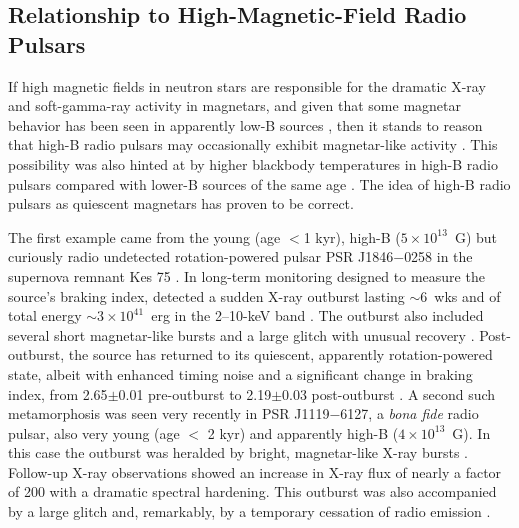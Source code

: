 \subsection{Relationship to High-Magnetic-Field Radio Pulsars}
\label{sec:highB}

If high magnetic fields in neutron stars are responsible for the dramatic X-ray and soft-gamma-ray activity in magnetars, and given
that some magnetar behavior has been seen in apparently low-B sources \citep[such as SGR 0418+5729;][]{ret+10}, then it stands
to reason that high-B radio pulsars may occasionally exhibit magnetar-like activity \citep{km05,nk11}.  
This possibility was also hinted at by higher blackbody temperatures in high-B radio pulsars compared
with lower-B sources of the same age \citep[e.g.][]{zkm+11,ozv+13}.
The idea of high-B radio pulsars as quiescent magnetars has proven
to be correct.

The first example came from the 
young (age $<$1 kyr), high-B ($5 \times 10^{13}$~G) but curiously
radio undetected \citep{aklm08} rotation-powered pulsar 
PSR J1846$-$0258 in the supernova remnant Kes 75 \citep{gvbt00}.   In long-term monitoring designed to 
measure the source's braking index, \citet{ggg+08} detected a sudden X-ray outburst lasting 
$\sim$6~wks and
of total energy $\sim 3 \times 10^{41}$~erg in the 2--10-keV band \citep[see also][]{ks08b}.  The outburst also included
several short magnetar-like bursts and a large glitch with unusual recovery \citep{kh09,lkg10}.
Post-outburst, the source has returned to its quiescent, apparently rotation-powered
state, albeit with enhanced timing noise and a significant change in braking index, from 
2.65$\pm$0.01 pre-outburst to 2.19$\pm$0.03 post-outburst \citep{lnk+11,akb+15}.  
A second such metamorphosis was seen very recently in PSR J1119$-$6127, a {\it bona fide} radio pulsar, also
very young (age $<$ 2 kyr) and apparently high-B ($4 \times 10^{13}$~G).  In this case the outburst was
heralded by bright, magnetar-like X-ray bursts \citep{ykr16,klm+16,glk+16}.  Follow-up X-ray observations \citep{akts16}
showed an increase in X-ray flux of nearly a factor of 200 with a dramatic spectral hardening.
This outburst was also accompanied
by a large glitch \citep{akts16} and, remarkably, by a temporary cessation of radio emission \citep{bpk+16}.

